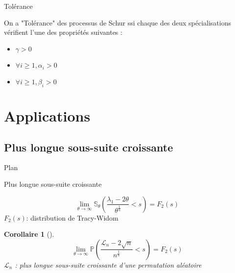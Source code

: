 \documentclass[french]{beamer}
\newtheorem{corollaire}[theorem]{Corollaire}
\begin{document}
\begin{frame}{Tolérance}
\begin{theorem}
On a "Tolérance" des processus de Schur ssi  chaque des deux spécialisations vérifient l'une des propriétés suivantes : 
\begin{itemize}
\item  $\gamma >0 $
\item $\forall i\geq 1 , \alpha_i >0 $ 
\item  $\forall i\geq 1 , \beta_i >0 $
\end{itemize}
\end{theorem}
\end{frame}
\section{Applications}
\subsection{Plus longue sous-suite croissante}
\begin{frame}{Plan}
\tableofcontents[currentsection,currentsubsection, 
    hideothersubsections, 
    sectionstyle=show/shaded,
]
\end{frame}
\begin{frame}{Plus longue sous-suite croissante}
\begin{theorem}
\begin{equation*}
\lim_{\theta \to \infty} \mathbb{S}_\theta\left(\frac{\lambda_1-2\theta}{\theta^\frac 1 3}<s\right)=F_2(s)
\end{equation*}
$F_2(s)$: distribution de Tracy-Widom
\end{theorem}
\begin{corollaire}[\citeauthor*{BDJ}]
\begin{equation*}
\lim_{\theta \to \infty} \mathbb{P}\left(\frac{\mathcal{L}_n-2\sqrt{n}}{n^\frac 1 6}<s\right)=F_2(s)
\end{equation*}
$\mathcal{L}_n$ : plus longue sous-suite croissante d'une permutation aléatoire 
\end{corollaire}
\end{frame}
\end{document}
